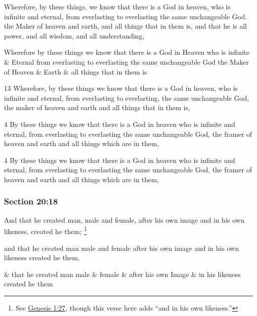 		\begin{framed}
		\scriptsize
			\begin{compactdesc}
				\item[JSP] Wherefore, by these things, we know that there is a God in heaven, who is infinite and eternal, from everlasting to everlasting the same unchangeable God. the Maker of heaven and earth, and all things that in them is, and that he is all power, and all wisdom, and all understanding,
				\item[RB1] Wherefore by these things we know that there is a God in Heaven who is infinite \& Eternal from everlasting to everlasting the same unchangeable God the Maker of Heaven \& Earth \& all things that in them is
				\item[BC] 13 Wherefore, by these things we know that there is a God in heaven, who is infinite and eternal, from everlasting to everlasting, the same unchangeable God, the maker of heaven and earth and all things that in them is,
				\item[DC 1835] 4 By these things we know that there is a God in heaven who is infinite and eternal, from everlasting to everlasting the same unchangeable God, the framer of heaven and earth and all things which are in them,
				\item[DC 1844] 4 By these things we know that there is a God in heaven who is infinite and eternal, from everlasting to everlasting the same unchangeable God, the framer of heaven and earth and all things which are in them,
			\end{compactdesc}
		\end{framed}

	\subsubsection{Section 20:18} %
		\label{DC20-18}

		And that he created man, male and female, after his own image and in his own likeness, created he them;%
			\footnote{%
				See \hyperref[GENESIS-1-27]{Genesis 1:27}, though this verse here adds ``and in his own likeness.'' 
				}

		\begin{framed}
		\scriptsize
			\begin{compactdesc}
				\item[JSP] and that he created man male and female after his own image and in his own likeness created he them,
				\item[RB1] \& that he created man male \& female \& after his own Image \& in his likeness created he them
			\end{compactdesc}
		\end{framed}

